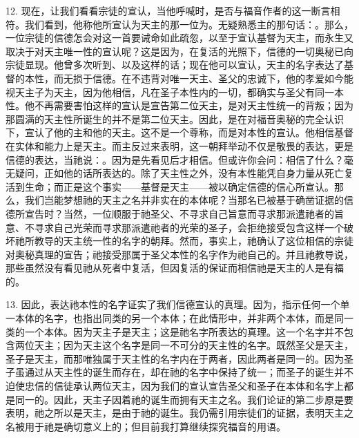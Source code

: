 12. 现在，让我们看看宗徒的宣认，当他呼喊时，是否与福音作者的这一断言相符。我们看到，他称他所宣认为天主的那一位为。无疑熟悉主的那句话：。那么，一位宗徒的信德怎会对这一首要诫命如此疏忽，以至于宣认基督为天主，而永生又取决于对天主唯一性的宣认呢？这是因为，在复活的光照下，信德的一切奥秘已向宗徒显现。他曾多次听到、以及这样的话；现在他可以宣认，天主的名字表达了基督的本性，而无损于信德。在不违背对唯一天主、圣父的忠诚下，他的孝爱如今能视天主子为天主，因为他相信，凡在圣子本性内的一切，都确实与圣父有同一本性。他不再需要害怕这样的宣认是宣告第二位天主，是对天主性统一的背叛；因为那圆满的天主性所诞生的并不是第二位天主。因此，是在对福音奥秘的完全认识下，宣认了他的主和他的天主。这不是一个尊称，而是对本性的宣认。他相信基督在实体和能力上是天主。而主反过来表明，这一朝拜举动不仅是敬畏的表达，更是信德的表达，当祂说：。因为是先看见后才相信。但或许你会问：相信了什么？毫无疑问，正如他的话所表达的。除了天主性之外，没有本性能凭自身力量从死亡复活到生命；而正是这个事实——基督是天主——被以确定信德的信心所宣认。那么，我们岂能梦想祂的天主之名并非实在的本体呢？当那名已被基于确凿证据的信德所宣告时？当然，一位顺服于祂圣父、不寻求自己旨意而寻求那派遣祂者的旨意、不寻求自己光荣而寻求那派遣祂者的光荣的圣子，会拒绝接受包含这样一个破坏祂所教导的天主统一性的名字的朝拜。然而，事实上，祂确认了这位相信的宗徒对奥秘真理的宣告；祂接受那属于圣父本性的名字作为祂自己的。并且祂教导说，那些虽然没有看见祂从死者中复活，但因复活的保证而相信祂是天主的人是有福的。\par

13. 因此，表达祂本性的名字证实了我们信德宣认的真理。因为，指示任何一个单一本体的名字，也指出同类的另一个本体；在此情形中，并非两个本体，而是同一类的一个本体。因为天主子是天主；这是祂名字所表达的真理。这一个名字并不包含两位天主；因为天主这个名字是同一不可分的天主性的名字。既然圣父是天主，圣子是天主，而那唯独属于天主性的名字内在于两者，因此两者是同一的。因为圣子虽通过从天主性的诞生而存在，却在祂的名字中保持了统一；而圣子的诞生并不迫使忠信的信徒承认两位天主，因为我们的宣认宣告圣父和圣子在本体和名字上都是同一的。因此，天主子因着祂的诞生而拥有天主之名。我们论证的第二步原是要表明，祂之所以是天主，是由于祂的诞生。我仍需引用宗徒们的证据，表明天主之名被用于祂是确切意义上的；但目前我打算继续探究福音的用语。\par

